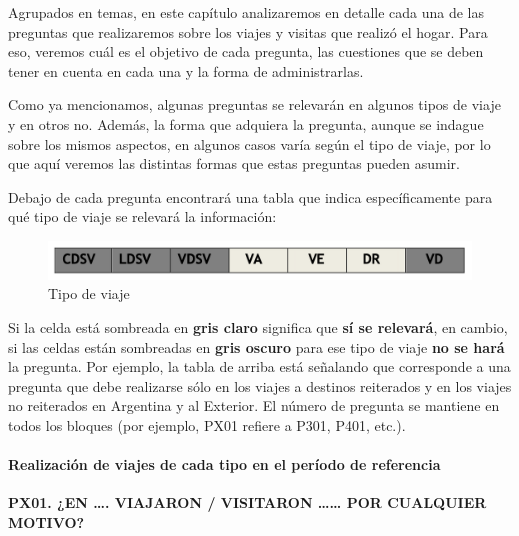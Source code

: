 \documentclass[
  openany]{book}
\begin{document}
Agrupados en temas, en este capítulo analizaremos en detalle cada una de las preguntas que realizaremos sobre los viajes y visitas que realizó el hogar. Para eso, veremos cuál es el objetivo de cada pregunta, las cuestiones que se deben tener en cuenta en cada una y la forma de administrarlas.

Como ya mencionamos, algunas preguntas se relevarán en algunos tipos de viaje y en otros no. Además, la forma que adquiera la pregunta, aunque se indague sobre los mismos aspectos, en algunos casos varía según el tipo de viaje, por lo que aquí veremos las distintas formas que estas preguntas pueden asumir.

Debajo de cada pregunta encontrará una tabla que indica específicamente para qué tipo de viaje se relevará la información:

\begin{figure}

{\centering \includegraphics[width=1\linewidth]{imagenes/figura6-72} 

}

\caption{Tipo de viaje}\label{fig:deta2}
\end{figure}

Si la celda está sombreada en \textbf{gris claro} significa que \textbf{sí se relevará}, en cambio, si las celdas están sombreadas en \textbf{gris oscuro} para ese tipo de viaje \textbf{no se hará} la pregunta. Por ejemplo, la tabla de arriba está señalando que corresponde a una pregunta que debe realizarse sólo en los viajes a destinos reiterados y en los viajes no reiterados en Argentina y al Exterior. El número de pregunta se mantiene en todos los bloques (por ejemplo, PX01 refiere a P301, P401, etc.).

\hypertarget{realizaciuxf3n-de-viajes-de-cada-tipo-en-el-peruxedodo-de-referencia}{%
\paragraph{Realización de viajes de cada tipo en el período de referencia}\label{realizaciuxf3n-de-viajes-de-cada-tipo-en-el-peruxedodo-de-referencia}}

\textbf{PX01. ¿EN \ldots. VIAJARON / VISITARON \ldots\ldots{} POR CUALQUIER MOTIVO?}
\end{document}
